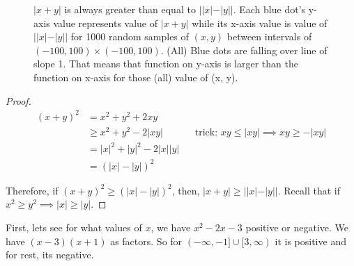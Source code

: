 \documentclass[answers,addpoints]{exam}
\begin{document}
\begin{questions}
\begin{solution}
    \begin{figure}[H]
        \centering
        \caption{ $|x+y|$ is always greater than equal to $||x|-|y||$. Each blue
            dot's y-axis value represents value of $|x+y|$ while its x-axis value is value of
            $||x|-|y||$ for 1000 random samples of $(x,y)$ between intervals of
            $(-100, 100)\times(-100,100)$. (All) Blue dots are  falling over line of slope 1.
            That means that function on  y-axis is
            larger than the function on x-axis  for those (all) value of (x, y).
        }
        \label{fig:2a}
    \end{figure}

    \begin{proof}
        \begin{align*}
            (x+y)^2 
            &= x^2 + y^2 + 2xy \\
            &\ge x^2 + y^2 - 2 |xy| && \text{trick: } xy \le |xy| \implies xy \ge -|xy| \\
            &= |x|^2 + |y|^2 - 2|x||y| \\
            &= (|x| - |y|)^2
        \end{align*}

        Therefore, if $(x+y)^2 \ge (|x|-|y|)^2$, then,  $|x+y| \ge ||x|-|y||$.
        Recall that if $x^2 \ge y^2 \implies |x| \ge |y|$.

    \end{proof}

\end{solution}


\begin{solution}

    First, lets see for what values of $x$, we have $x^2 - 2x - 3$ positive or
    negative. We have $(x-3)(x+1)$ as factors. So for $(-\infty, -1] \cup [3,
    \infty)$ it is positive and for rest, its negative.


\end{solution}
\end{questions}
\end{document}
